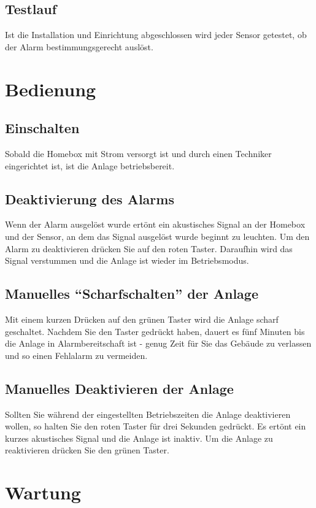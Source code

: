 \documentclass[a4paper,12pt]{article}
\begin{document}
\subsection{Testlauf}
Ist die Installation und Einrichtung abgeschlossen wird jeder Sensor getestet, ob der Alarm bestimmungsgerecht auslöst.

\newpage

\section{Bedienung}
\subsection{Einschalten}
Sobald die Homebox mit Strom versorgt ist und durch einen Techniker eingerichtet ist, ist die Anlage betriebsbereit.

\subsection{Deaktivierung des Alarms}
Wenn der Alarm ausgelöst wurde ertönt ein akustisches Signal an der Homebox und der Sensor, an dem das Signal ausgelöst wurde beginnt zu leuchten. Um den Alarm zu deaktivieren drücken Sie auf den roten Taster. Daraufhin wird das Signal verstummen und die Anlage ist wieder im Betriebsmodus.

\subsection{Manuelles “Scharfschalten” der Anlage}
Mit einem kurzen Drücken auf den grünen Taster wird die Anlage scharf geschaltet. Nachdem Sie den Taster gedrückt haben, dauert es fünf Minuten bis die Anlage in Alarmbereitschaft ist - genug Zeit für Sie das Gebäude zu verlassen und so einen Fehlalarm zu vermeiden.

\subsection{Manuelles Deaktivieren der Anlage}
Sollten Sie während der eingestellten Betriebszeiten die Anlage deaktivieren wollen, so halten Sie den roten Taster für drei Sekunden gedrückt. Es ertönt ein kurzes akustisches Signal und die Anlage ist inaktiv. Um die Anlage zu reaktivieren drücken Sie den grünen Taster.


\section{Wartung}
\end{document}
